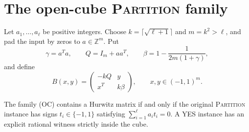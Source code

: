\section{The open-cube \textsc{Partition} family}
\label{sec:open-cube-independent}

Let $a_1,\ldots,a_\ell$ be positive integers. Choose
$k=\lceil\sqrt{\ell+1}\rceil$ and $m=k^2>\ell$, and pad the input by zeros to
$a\in\mathbb Z^m$. Put
\[
 \gamma=a^Ta,\qquad Q=I_m+aa^T,\qquad
 \beta=1-\frac{1}{2m(1+\gamma)},
\]
and define
\[
 B(x,y)=\begin{pmatrix}-kQ&y\\x^T&k\beta\end{pmatrix},
 \qquad x,y\in(-1,1)^m.
 \tag{OC}
\]

\begin{theorem}
\label{thm:open-cube-independent}
The family (OC) contains a Hurwitz matrix if and only if the original
\textsc{Partition} instance has signs $t_i\in\{-1,1\}$ satisfying
$\sum_{i=1}^{\ell}a_it_i=0$. A YES instance has an explicit rational witness
strictly inside the cube.
\end{theorem}

